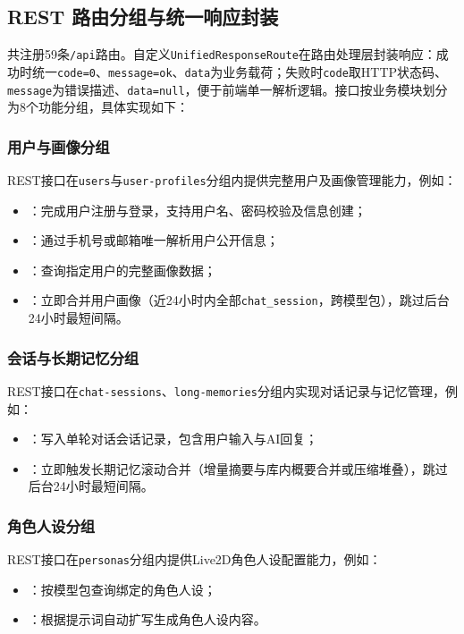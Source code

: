 \documentclass{base}
\begin{document}
\subsection{REST 路由分组与统一响应封装}
共注册59条\texttt{/api}路由。自定义\texttt{UnifiedResponseRoute}在路由处理层封装响应：成功时统一\texttt{code=0}、\texttt{message=ok}、\texttt{data}为业务载荷；失败时\texttt{code}取HTTP状态码、\texttt{message}为错误描述、\texttt{data=null}，便于前端单一解析逻辑。接口按业务模块划分为8个功能分组，具体实现如下：

\subsubsection*{用户与画像分组}
REST接口在\texttt{users}与\texttt{user-profiles}分组内提供完整用户及画像管理能力，例如：
\begin{itemize}\setlength{\itemsep}{2pt}\setlength{\parsep}{0pt}
    \item {}：完成用户注册与登录，支持用户名、密码校验及信息创建；
    \item {}：通过手机号或邮箱唯一解析用户公开信息；
    \item {}：查询指定用户的完整画像数据；
    \item {}：立即合并用户画像（近24小时内全部\texttt{chat\_session}，跨模型包），跳过后台24小时最短间隔。
\end{itemize}

\subsubsection*{会话与长期记忆分组}
REST接口在\texttt{chat-sessions}、\texttt{long-memories}分组内实现对话记录与记忆管理，例如：
\begin{itemize}\setlength{\itemsep}{2pt}\setlength{\parsep}{0pt}
    \item {}：写入单轮对话会话记录，包含用户输入与AI回复；
    \item {}：立即触发长期记忆滚动合并（增量摘要与库内概要合并或压缩堆叠），跳过后台24小时最短间隔。
\end{itemize}

\subsubsection*{角色人设分组}
REST接口在\texttt{personas}分组内提供Live2D角色人设配置能力，例如：
\begin{itemize}\setlength{\itemsep}{2pt}\setlength{\parsep}{0pt}
    \item {}：按模型包查询绑定的角色人设；
    \item {}：根据提示词自动扩写生成角色人设内容。
\end{itemize}
\end{document}
